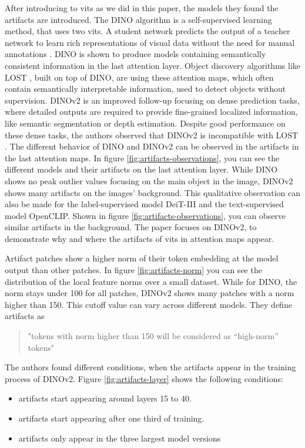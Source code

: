 \documentclass[conference]{IEEEtran}
\begin{document}
  After introducing to \acp{vit} as we did in this paper, the models they found the artifacts are introduced. The \mbox{DINO} algorithm is a self-supervised learning method, that uses two \acp{vit}. A student network predicts the output of a teacher network to learn rich representations of visual data without the need for manual annotations \cite{dino}. \mbox{DINO} is shown to produce models containing semantically consistent information in the last attention layer. Object discovery algorithms like \mbox{LOST} \cite{lost}, built on top of \mbox{DINO}, are using these attention maps, which often contain semantically interpretable information, used to detect objects without supervision. \mbox{DINOv2} \cite{dinov2} is an improved follow-up focusing on dense prediction tasks, where detailed outputs are required to provide fine-grained localized information, like semantic segmentation or depth estimation. Despite good performance on these dense tasks, the authors observed that \mbox{DINOv2} is incompatible with \mbox{LOST} \cite{registers}. The different behavior of \mbox{DINO} and \mbox{DINOv2} can be observed in the artifacts in the last attention maps. In figure \ref{fig:artifacts-observations}, you can see the different models and their artifacts on the last attention layer.
  While \mbox{DINO} shows no peak outlier values focusing on the main object in the image, \mbox{DINOv2} shows many artifacts on the images' background. This qualitative observation can also be made for the label-supervised model \mbox{DeiT-III} and the text-supervised model \mbox{OpenCLIP}. Shown in figure \ref{fig:artifacts-observations}, you can observe similar artifacts in the background.
  The paper focuses on \mbox{DINOv2}, to demonstrate why and where the artifacts of \acp{vit} in attention maps appear.

  Artifact patches show a higher norm of their token embedding at the  model output than other patches. In figure \ref{fig:artifacts-norm} you can see the distribution of the local feature norms over a small dataset. While for \mbox{DINO}, the norm stays under 100 for all patches, \mbox{DINOv2} shows many patches with a norm higher than 150. This cutoff value can vary across different models. They define artifacts as
  \begin{quote}
   "tokens with norm higher than 150 will be considered as “high-norm” tokens" \cite{registers}
  \end{quote}
  
  The authors found different conditions, when the artifacts appear in the training process of \mbox{DINOv2}. Figure \ref{fig:artifacts-layer} shows the following conditions:
  \begin{itemize}
    \item artifacts start appearing around layers 15 to 40.
    \item artifacts start appearing after one third of training.
    \item artifacts only appear in the three largest model versions
  \end{itemize}
\end{document}
